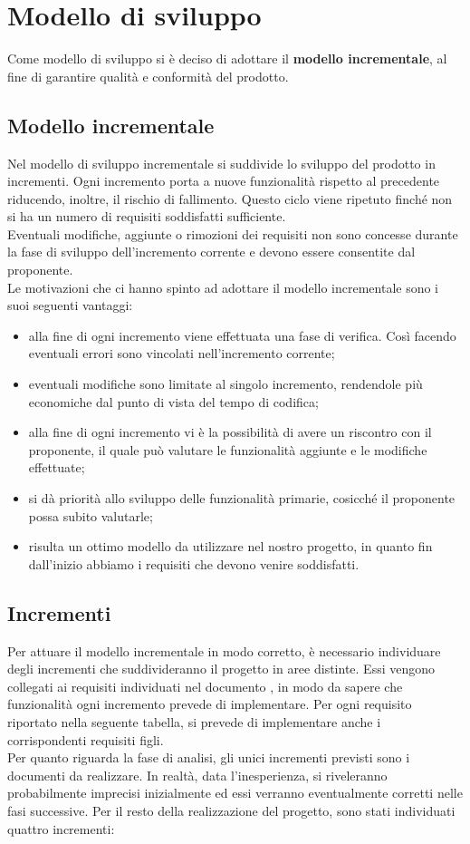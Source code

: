\section{Modello di sviluppo}
Come modello di sviluppo si è deciso di adottare il \textbf{modello incrementale}, al fine di garantire qualità e conformità del prodotto.

\subsection{Modello incrementale}
Nel modello di sviluppo incrementale si suddivide lo sviluppo del prodotto in incrementi. Ogni incremento porta a nuove funzionalità rispetto al precedente riducendo, inoltre, il rischio di fallimento. Questo ciclo viene ripetuto finché non si ha un numero di requisiti soddisfatti sufficiente.\\
Eventuali modifiche, aggiunte o rimozioni dei requisiti non sono concesse durante la fase di sviluppo dell'incremento corrente e devono essere consentite dal proponente.\\
Le motivazioni che ci hanno spinto ad adottare il modello incrementale sono i suoi seguenti vantaggi:
\begin{itemize}
\item alla fine di ogni incremento viene effettuata una fase di verifica. Così facendo eventuali errori sono vincolati nell'incremento corrente;
\item eventuali modifiche sono limitate al singolo incremento, rendendole più economiche dal punto di vista del tempo di codifica;
\item alla fine di ogni incremento vi è la possibilità di avere un riscontro con il proponente, il quale può valutare le funzionalità aggiunte e le modifiche effettuate;
\item si dà priorità allo sviluppo delle funzionalità primarie, cosicché il proponente possa subito valutarle;
\item risulta un ottimo modello da utilizzare nel nostro progetto, in quanto fin dall'inizio abbiamo i requisiti che devono venire soddisfatti.
\end{itemize}

\subsection{Incrementi}
Per attuare il modello incrementale in modo corretto, è necessario individuare degli incrementi che suddivideranno il progetto in aree distinte. Essi vengono collegati ai requisiti individuati nel documento , in modo da sapere che funzionalità ogni incremento prevede di implementare. Per ogni requisito riportato nella seguente tabella, si prevede di implementare anche i corrispondenti requisiti figli. \\
Per quanto riguarda la fase di analisi, gli unici incrementi previsti sono i documenti da realizzare. In realtà, data l'inesperienza, si riveleranno probabilmente imprecisi inizialmente ed essi verranno eventualmente corretti nelle fasi successive.
Per il resto della realizzazione del progetto, sono stati individuati quattro incrementi:

